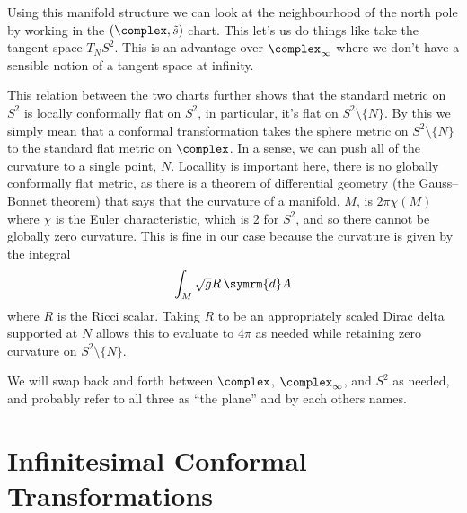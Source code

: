 \documentclass[fleqn]{NotesClass}
\renewcommand{\dd}[1]{\,\symrm{d}#1}
\begin{document}
    Using this manifold structure we can look at the neighbourhood of the north pole by working in the \((\complex, \tilde{s})\) chart.
    This let's us do things like take the tangent space \(T_NS^2\).
    This is an advantage over \(\complex_{\infty}\) where we don't have a sensible notion of a tangent space at infinity.
    
    This relation between the two charts further shows that the standard metric on \(S^2\) is locally conformally flat on \(S^2\), in particular, it's flat on \(S^2 \setminus \{N\}\).
    By this we simply mean that a conformal transformation takes the sphere metric on \(S^2\setminus\{N\}\) to the standard flat metric on \(\complex\).
    In a sense, we can push all of the curvature to a single point, \(N\).
    Locallity is important here, there is no globally conformally flat metric, as there is a theorem of differential geometry (the Gauss--Bonnet theorem) that says that the curvature of a manifold, \(M\), is \(2\pi \chi(M)\) where \(\chi\) is the Euler characteristic, which is 2 for \(S^2\), and so there cannot be globally zero curvature.
    This is fine in our case because the curvature is given by the integral
    \begin{equation}
        \int_M \sqrt{g} R \dd{A}
    \end{equation}
    where \(R\) is the Ricci scalar.
    Taking \(R\) to be an appropriately scaled Dirac delta supported at \(N\) allows this to evaluate to \(4\pi\) as needed while retaining zero curvature on \(S^2\setminus\{N\}\).
    
    We will swap back and forth between \(\complex\), \(\complex_{\infty}\), and \(S^2\) as needed, and probably refer to all three as \enquote{the plane} and by each others names.
    
    \section{Infinitesimal Conformal Transformations}
    
    
    
\end{document}
